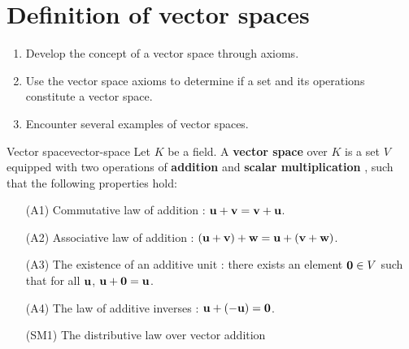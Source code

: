 \section{Definition of vector spaces}

\begin{outcome}
  \begin{enumerate}
  \item Develop the concept of a vector space through axioms.
  \item Use the vector space axioms to determine if a set and its
    operations constitute a vector space.
  \item Encounter several examples of vector spaces.
  \end{enumerate}
\end{outcome}

\begin{definition}{Vector space}{vector-space}
  Let $K$ be a field. A \textbf{vector space} over $K$%
   is a set $V$ equipped with two operations of
  \textbf{addition}%
    and
  \textbf{scalar multiplication}%
  , such that the following properties hold:
  \begin{itemize}\setlength\itemsep{0em}
  \item[(A1)] Commutative law of addition%
    :
    $\mbox{\bf u} + \mbox{\bf v}=\mbox{\bf v} + \mbox{\bf u}$.
  \item[(A2)] Associative law of addition%
    :
    $(\mbox{\bf u} + \mbox{\bf v}) + \mbox{\bf w}=\mbox{\bf u} + (\mbox{\bf v} + \mbox{\bf w})$.
  \item[(A3)] The existence of an additive unit%
    : there exists an element $\mbox{\bf 0}\in
    V$ such that for all $\mbox{\bf u}$,
    $\mbox{\bf u} + \mbox{\bf 0}=\mbox{\bf u}$.
  \item[(A4)] The law of additive inverses%
    :
    $\mbox{\bf u} + (-\mbox{\bf u}) =\mbox{\bf 0}$.
  \item[(SM1)] The distributive law over vector addition%

\end{itemize}
\end{definition}
